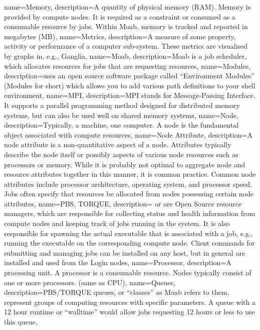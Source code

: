 {
  name={Memory},
  description={A quantity of physical memory (RAM). Memory is provided by compute nodes. It is required as a constraint or consumed as a consumable resource by jobs. Within Moab, memory is tracked and reported in megabytes (MB)},
}
{
  name={Metrics},
  description={A measure of some property, activity or performance of a computer sub-system. These metrics are visualised by graphs in, e.g., Ganglia},
}
{
  name={Moab},
  description={Moab is a job scheduler, which allocates resources for jobs that are requesting resources},
}
{
  name={Modules},
  description={\hpc uses an open source software package called ``Environment Modules'' (Modules for short) which allows you to add various path definitions to your shell environment},
}
{
  name={MPI},
  description={MPI stands for Message-Passing Interface. It supports a parallel programming method designed for distributed memory systems, but can also be used well on shared memory systems},
}
{
  name={Node},
  description={Typically, a machine, one computer. A node is the fundamental object associated with compute resources},
}
{
  name={Node Attribute},
  description={A node attribute is a non-quantitative aspect of a node. Attributes typically describe the node itself or possibly aspects of various node resources such as processors or memory. While it is probably not optimal to aggregate node and resource attributes together in this manner, it is common practice. Common node attributes include processor architecture, operating system, and processor speed. Jobs often specify that resources be allocated from nodes possessing certain node attributes},
}
{
  name={PBS, TORQUE},
  description={ or  are Open Source resource managers, which are responsible for collecting status and health information from compute nodes and keeping track of jobs running in the system. It is also responsible for spawning the actual executable that is associated with a job, e.g., running the executable on the corresponding compute node. Client commands for submitting and managing jobs can be installed on any host, but in general are installed and used from the Login nodes},
}
{
  name={Processor},
  description={A processing unit. A processor is a consumable resource. Nodes typically consist of one or more processors. (same as CPU)},
}
{
  name={Queues},
  description={PBS/TORQUE queues, or ``classes'' as Moab refers to them, represent groups of computing resources with specific parameters. A queue with a 12 hour runtime or ``walltime'' would allow jobs requesting 12 hours or less to use this queue},
}
